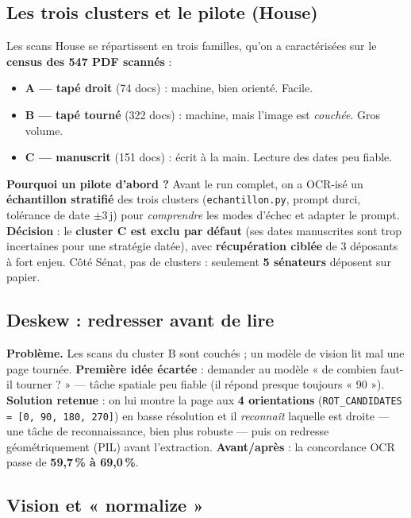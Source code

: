 \documentclass[11pt,a4paper]{article}
\newcommand{\code}[1]{\texttt{\small #1}}
\begin{document}
\subsection{Les trois clusters et le pilote (House)}

Les scans House se répartissent en trois familles, qu'on a caractérisées sur le \textbf{census des 547
PDF scannés} :
\begin{itemize}[nosep,leftmargin=1.4em]
\item \textbf{A --- tapé droit} (74 docs) : machine, bien orienté. Facile.
\item \textbf{B --- tapé tourné} (322 docs) : machine, mais l'image est \emph{couchée}. Gros volume.
\item \textbf{C --- manuscrit} (151 docs) : écrit à la main. Lecture des dates peu fiable.
\end{itemize}

\textbf{Pourquoi un pilote d'abord ?} Avant le run complet, on a OCR-isé un \textbf{échantillon
stratifié} des trois clusters (\code{echantillon.py}, prompt durci, tolérance de date $\pm$3\,j) pour
\emph{comprendre} les modes d'échec et adapter le prompt. \textbf{Décision} : le \textbf{cluster C est
exclu par défaut} (ses dates manuscrites sont trop incertaines pour une stratégie datée), avec
\textbf{récupération ciblée} de 3 déposants à fort enjeu. Côté Sénat, pas de clusters : seulement
\textbf{5 sénateurs} déposent sur papier.

\subsection{Deskew : redresser avant de lire}

\textbf{Problème.} Les scans du cluster B sont couchés ; un modèle de vision lit mal une page tournée.
\textbf{Première idée écartée} : demander au modèle « de combien faut-il tourner ? » --- tâche spatiale
peu fiable (il répond presque toujours « 90 »). \textbf{Solution retenue} : on lui montre la page aux
\textbf{4 orientations} (\code{ROT\_CANDIDATES = [0, 90, 180, 270]}) en basse résolution et il
\emph{reconnaît} laquelle est droite --- une tâche de reconnaissance, bien plus robuste --- puis on
redresse géométriquement (PIL) avant l'extraction. \textbf{Avant/après} : la concordance OCR passe de
\textbf{59,7\,\% à 69,0\,\%}.

\subsection{Vision et « normalize »}
\end{document}
